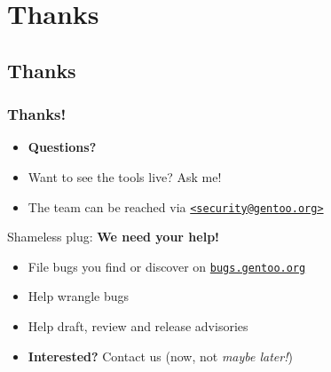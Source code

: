 \documentclass[svgnames]{beamer}
\begin{document}
\section{Thanks}
\subsection*{Thanks}

\begin{frame}
  \frametitle{Thanks!}
  
  \begin{itemize}
    \item \textbf{Questions?}
  \end{itemize}

  \begin{itemize}
    \item Want to see the tools live? Ask me!
    \item The team can be reached via \href{mailto:security@gentoo.org}{\texttt{<security@gentoo.org>}}
  \end{itemize}

  \pause

  \begin{block}{Shameless plug: \alert{\textbf{We need your help!}}}
    \begin{itemize}
     \item File bugs you find or discover on \href{https://bugs.gentoo.org/}{\texttt{bugs.gentoo.org}}
     \item Help wrangle bugs
     \item Help draft, review and release advisories
     \item \textbf{Interested?} Contact us (now, not \textit{maybe later!})
    \end{itemize}

   
  \end{block}

\end{frame}
\end{document}
